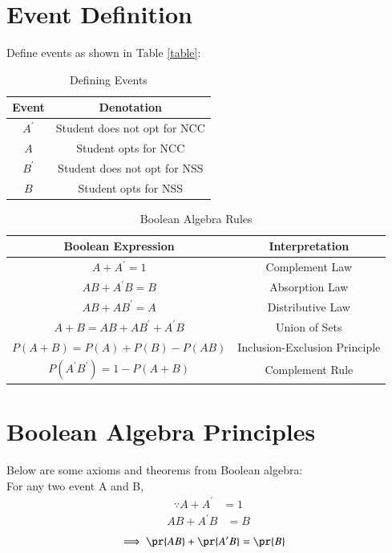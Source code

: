 \documentclass[journal]{IEEEtran}
\begin{document}
\section{Event Definition}
Define events as shown in Table \ref{table}:
\begin{table}[h!]    
  \centering
  \begin{tabular}[12pt]{ |c| c| } 
    \hline
    {Event} & {Denotation}\\ 
    \hline
    $A^\prime $ &  Student does not opt for NCC \\
    \hline 
    $ A $ & Student opts for NCC\\
    \hline
    $ B^\prime $ & Student does not opt for NSS\\
    \hline   
    $ B $ & Student opts for NSS \\
    \hline
  \end{tabular}
  \caption{Defining Events}
  \label{table1}
\end{table}

\begin{table}[h!]    
  \centering
  \begin{tabular}[12pt]{ |c| c| } 
    \hline
    {Boolean Expression} & {Interpretation}\\ 
    \hline
    $A + A^\prime = 1$ & Complement Law\\
    \hline
    $AB + A^\prime B = B$ & Absorption Law\\
    \hline
    $AB + AB^\prime = A$ & Distributive Law\\
    \hline
    $A + B = AB + AB^\prime + A^\prime B$ & Union of Sets\\
    \hline
    $P(A + B) = P(A) + P(B) - P(AB)$ & Inclusion-Exclusion Principle\\
    \hline
    $P(A^\prime B^\prime) = 1 - P(A + B)$ & Complement Rule\\
    \hline
  \end{tabular}
  \caption{Boolean Algebra Rules}
  \label{table2}
\end{table}

\section{Boolean Algebra Principles}
Below are some axioms and theorems from Boolean algebra:\\
 For any two event A and B,
\begin{align}
	\because A + A^\prime &= 1 
    \end{align}
    \begin{align}
	 AB + A^\prime B &= B \label{2} 
     \end{align}
     \begin{align}
	 \implies \pr{AB} + \pr{A^\prime B} &= \pr{B} \label{3} 
     \end{align}
     
\end{document}

